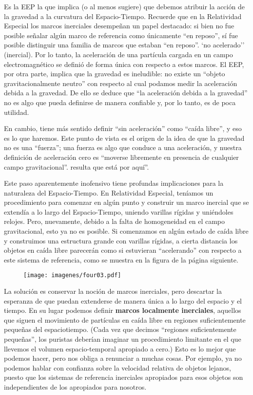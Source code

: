 \documentclass[11pt,b5paper,openany,twoside]{book}
\begin{document}
Es la EEP la que implica (o al menos sugiere) que debemos atribuir la acción de la gravedad a la curvatura del Espacio-Tiempo.
Recuerde que en la Relatividad Especial los marcos inerciales desempeñan un papel destacado: si bien no fue posible señalar algún marco de referencia como únicamente ``en reposo'', sí fue posible distinguir una familia de marcos que estaban ``en reposo''. `no acelerado'' (inercial).
Por lo tanto, la aceleración de una partícula cargada en un campo electromagnético se definió de forma única con respecto a estos marcos.
El EEP, por otra parte, implica que la gravedad es ineludible: no existe un ``objeto gravitacionalmente neutro'' con respecto al cual podamos medir la aceleración debida a la gravedad.
De ello se deduce que ``la aceleración debida a la gravedad'' no es algo que pueda definirse de manera confiable y, por lo tanto, es de poca utilidad.

En cambio, tiene más sentido definir ``sin aceleración'' como ``caída libre'', y eso es lo que haremos.
Este punto de vista es el origen de la idea de que la gravedad no es una ``fuerza''; una fuerza es algo que conduce a una aceleración, y nuestra definición de aceleración cero es ``moverse libremente en presencia de cualquier campo gravitacional''. resulta que está por aquí”.

Este paso aparentemente inofensivo tiene profundas implicaciones para la naturaleza del Espacio-Tiempo.
En Relatividad Especial, teníamos un procedimiento para comenzar en algún punto y construir un marco inercial que se extendía a lo largo del Espacio-Tiempo, uniendo varillas rígidas y uniéndoles relojes.
Pero, nuevamente, debido a la falta de homogeneidad en el campo gravitacional, esto ya no es posible.
Si comenzamos en algún estado de caída libre y construimos una estructura grande con varillas rígidas, a cierta distancia los objetos en caída libre parecerán como si estuvieran ``acelerando'' con respecto a este sistema de referencia, como se muestra en la figura de la página siguiente.

\begin{figure}[h]
\centering
\texttt{[image: imagenes/four03.pdf]}
\end{figure}

La solución es conservar la noción de marcos inerciales, pero descartar la esperanza de que puedan extenderse de manera única a lo largo del espacio y el tiempo.
En su lugar podemos definir {\bf marcos localmente inerciales}, aquellos que siguen el movimiento de partículas en caída libre en regiones suficientemente pequeñas del espaciotiempo.
(Cada vez que decimos ``regiones suficientemente pequeñas'', los puristas deberían imaginar un procedimiento limitante en el que llevemos el volumen espacio-temporal apropiado a cero.)
Esto es lo mejor que podemos hacer, pero nos obliga a renunciar a muchas cosas.
Por ejemplo, ya no podemos hablar con confianza sobre la velocidad relativa de objetos lejanos, puesto que los sistemas de referencia inerciales apropiados para esos objetos son independientes de los apropiados para nosotros.
\end{document}
